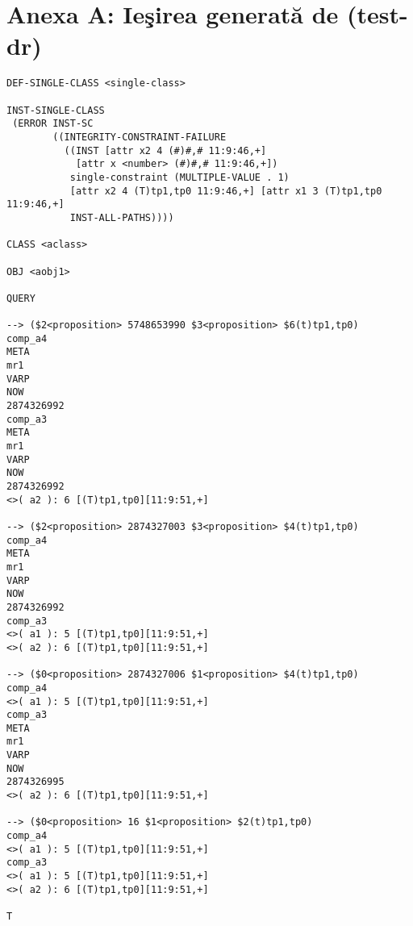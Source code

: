 \documentclass{article}
\begin{document}
\section{Anexa A: Ie\c{s}irea generat\u{a} de (test-dr)}
{\scriptsize
\begin{verbatim}
DEF-SINGLE-CLASS <single-class>

INST-SINGLE-CLASS
 (ERROR INST-SC
        ((INTEGRITY-CONSTRAINT-FAILURE
          ((INST [attr x2 4 (#)#,# 11:9:46,+]
            [attr x <number> (#)#,# 11:9:46,+])
           single-constraint (MULTIPLE-VALUE . 1)
           [attr x2 4 (T)tp1,tp0 11:9:46,+] [attr x1 3 (T)tp1,tp0 11:9:46,+]
           INST-ALL-PATHS))))

CLASS <aclass>

OBJ <aobj1>

QUERY

--> ($2<proposition> 5748653990 $3<proposition> $6(t)tp1,tp0)
comp_a4
META
mr1
VARP
NOW
2874326992
comp_a3
META
mr1
VARP
NOW
2874326992
<>( a2 ): 6 [(T)tp1,tp0][11:9:51,+]

--> ($2<proposition> 2874327003 $3<proposition> $4(t)tp1,tp0)
comp_a4
META
mr1
VARP
NOW
2874326992
comp_a3
<>( a1 ): 5 [(T)tp1,tp0][11:9:51,+]
<>( a2 ): 6 [(T)tp1,tp0][11:9:51,+]

--> ($0<proposition> 2874327006 $1<proposition> $4(t)tp1,tp0)
comp_a4
<>( a1 ): 5 [(T)tp1,tp0][11:9:51,+]
comp_a3
META
mr1
VARP
NOW
2874326995
<>( a2 ): 6 [(T)tp1,tp0][11:9:51,+]

--> ($0<proposition> 16 $1<proposition> $2(t)tp1,tp0)
comp_a4
<>( a1 ): 5 [(T)tp1,tp0][11:9:51,+]
comp_a3
<>( a1 ): 5 [(T)tp1,tp0][11:9:51,+]
<>( a2 ): 6 [(T)tp1,tp0][11:9:51,+]

T
\end{verbatim}
}

\newpage
\end{document}
